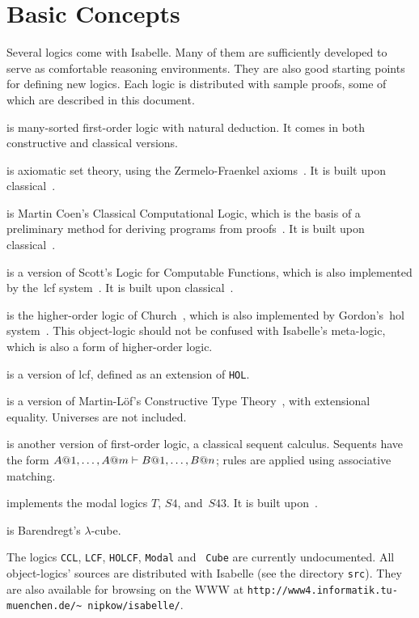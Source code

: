 \chapter{Basic Concepts}
Several logics come with Isabelle.  Many of them are sufficiently developed
to serve as comfortable reasoning environments.  They are also good
starting points for defining new logics.  Each logic is distributed with
sample proofs, some of which are described in this document.

\begin{ttdescription}
\item[\thydx{FOL}] is many-sorted first-order logic with natural
deduction.  It comes in both constructive and classical versions.

\item[\thydx{ZF}] is axiomatic set theory, using the Zermelo-Fraenkel
axioms~\cite{suppes72}.  It is built upon classical~\FOL{}.

\item[\thydx{CCL}] is Martin Coen's Classical Computational Logic,
  which is the basis of a preliminary method for deriving programs from
  proofs~\cite{coen92}.  It is built upon classical~\FOL{}.
 
\item[\thydx{LCF}] is a version of Scott's Logic for Computable
  Functions, which is also implemented by the~{\sc lcf}
  system~\cite{paulson87}.  It is built upon classical~\FOL{}.

\item[\thydx{HOL}] is the higher-order logic of Church~\cite{church40},
which is also implemented by Gordon's~{\sc hol} system~\cite{mgordon-hol}.
This object-logic should not be confused with Isabelle's meta-logic, which is
also a form of higher-order logic.

\item[\thydx{HOLCF}] is a version of {\sc lcf}, defined as an
  extension of {\tt HOL}\@.
 
\item[\thydx{CTT}] is a version of Martin-L\"of's Constructive Type
Theory~\cite{nordstrom90}, with extensional equality.  Universes are not
included.
 
\item[\thydx{LK}] is another version of first-order logic, a classical
sequent calculus.  Sequents have the form $A@1,\ldots,A@m\vdash
B@1,\ldots,B@n$; rules are applied using associative matching.

\item[\thydx{Modal}] implements the modal logics $T$, $S4$,
  and~$S43$.  It is built upon~\LK{}.

\item[\thydx{Cube}] is Barendregt's $\lambda$-cube.
\end{ttdescription}
The logics {\tt CCL}, {\tt LCF}, {\tt HOLCF}, {\tt Modal} and {\tt
  Cube} are currently undocumented. All object-logics' sources are
distributed with Isabelle (see the directory \texttt{src}).  They are
also available for browsing on the WWW at
\texttt{http://www4.informatik.tu-muenchen.de/\~\relax
  nipkow/isabelle/}.

